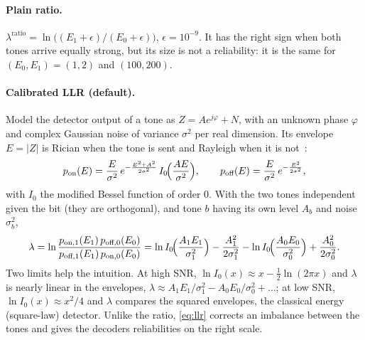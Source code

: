\documentclass[11pt,a4paper]{article}
\theoremstyle{remark}
\begin{document}
\paragraph{Plain ratio.}
$\lambda^{\mathrm{ratio}} = \ln\bigl((E_1 + \epsilon)/(E_0 + \epsilon)\bigr)$, $\epsilon = 10^{-9}$. It has the right sign when both tones arrive equally strong, but its size is not a reliability: it is the same for $(E_0, E_1) = (1, 2)$ and $(100, 200)$.

\paragraph{Calibrated LLR (default).}
\label{sec:llr}
Model the detector output of a tone as $Z = A e^{j\varphi} + N$, with an unknown phase $\varphi$ and complex Gaussian noise of variance $\sigma^2$ per real dimension. Its envelope $E = |Z|$ is Rician when the tone is sent and Rayleigh when it is not~\cite{rice,proakis}:
\begin{equation}
p_{\text{on}}(E) = \frac{E}{\sigma^2}\, e^{-\frac{E^2 + A^2}{2\sigma^2}}\, I_0\!\Bigl(\frac{AE}{\sigma^2}\Bigr), \qquad
p_{\text{off}}(E) = \frac{E}{\sigma^2}\, e^{-\frac{E^2}{2\sigma^2}},
\end{equation}
with $I_0$ the modified Bessel function of order 0. With the two tones independent given the bit (they are orthogonal), and tone $b$ having its own level $A_b$ and noise $\sigma_b^2$,
\begin{equation}
\lambda = \ln \frac{p_{\text{on},1}(E_1)\, p_{\text{off},0}(E_0)}{p_{\text{off},1}(E_1)\, p_{\text{on},0}(E_0)}
= \ln I_0\!\Bigl(\frac{A_1 E_1}{\sigma_1^2}\Bigr) - \frac{A_1^2}{2\sigma_1^2} - \ln I_0\!\Bigl(\frac{A_0 E_0}{\sigma_0^2}\Bigr) + \frac{A_0^2}{2\sigma_0^2} .
\label{eq:llr}
\end{equation}
Two limits help the intuition. At high SNR, $\ln I_0(x) \approx x - \tfrac12 \ln(2\pi x)$ and $\lambda$ is nearly linear in the envelopes, $\lambda \approx A_1 E_1/\sigma_1^2 - A_0 E_0/\sigma_0^2 + \dots$; at low SNR, $\ln I_0(x) \approx x^2/4$ and $\lambda$ compares the squared envelopes, the classical energy (square-law) detector. Unlike the ratio, \cref{eq:llr} corrects an imbalance between the tones and gives the decoders reliabilities on the right scale.
\end{document}
